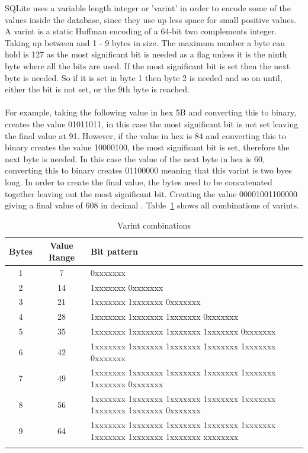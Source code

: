 SQLite uses a variable length integer or 'varint' in order to encode some of the values inside the database, since they use up less space for small positive values. A varint is a static Huffman encoding of a 64-bit two complements integer. Taking up between and 1 - 9 bytes in size. The maximum number a byte can hold is 127 as the most significant bit is needed as a flag unless it is the ninth byte where all the bits are used. If the most significant bit is set then the next byte is needed. So if it is set in byte 1 then byte 2 is needed and so on until, either the bit is not set, or the 9th byte is reached.
\\\\
For example, taking the following value in hex 5B and converting this to binary, creates the value 01011011, in this case the most significant bit is not set leaving the final value at 91. However, if the value in hex is 84 and converting this to binary creates the value 10000100, the most significant bit is set, therefore the next byte is needed. In this case the value of the next byte in hex is 60, converting this to binary creates  01100000 meaning that this varint is two byes long. In order to create the final value, the bytes need to be concatenated together leaving out the most significant bit. Creating the value 00001001100000 giving a final value of 608 in decimal \citep{sausagefactory}. Table~\ref{tbl:varints} shows  all combinations of varints. 

\begin{longtable}[h]{| c | c | p{10cm} |}
		\hline
			\textbf{Bytes} & \textbf{Value Range} & \textbf{Bit pattern} \\ 
		\hline
		\endhead
			1 & 7 &  0xxxxxxx \\ \hline
			2 & 14 & 1xxxxxxx 0xxxxxxx\\ \hline
			3 & 21 & 1xxxxxxx 1xxxxxxx 0xxxxxxx\\ \hline
			4 & 28 & 1xxxxxxx 1xxxxxxx 1xxxxxxx 0xxxxxxx\\ \hline
			5 & 35 & 1xxxxxxx 1xxxxxxx 1xxxxxxx 1xxxxxxx 0xxxxxxx\\ \hline
			6 & 42 & 1xxxxxxx 1xxxxxxx 1xxxxxxx 1xxxxxxx 1xxxxxxx 0xxxxxxx\\ \hline
			7 & 49 & 1xxxxxxx 1xxxxxxx 1xxxxxxx 1xxxxxxx 1xxxxxxx 1xxxxxxx 0xxxxxxx\\ \hline
			8 & 56 & 1xxxxxxx 1xxxxxxx 1xxxxxxx 1xxxxxxx 1xxxxxxx 1xxxxxxx 1xxxxxxx 0xxxxxxx\\ \hline
			9 & 64 & 1xxxxxxx 1xxxxxxx 1xxxxxxx 1xxxxxxx 1xxxxxxx 1xxxxxxx 1xxxxxxx 1xxxxxxx xxxxxxxx\\
		\hline
	\caption{Varint combinations \cite{sqliteray}}
	\label{tbl:varints}
\end{longtable}

